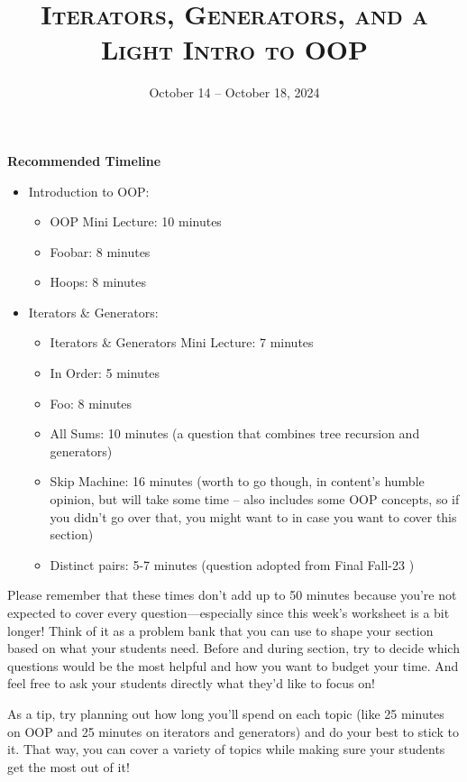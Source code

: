 \documentclass{exam}
\title{\textsc{Iterators, Generators, and a Light Intro to OOP}}
\date{October 14 -- October 18, 2024}
\begin{document}
\maketitle
\begin{guide}
    \textbf{Recommended Timeline}
    \begin{itemize}
        \item Introduction to OOP:
        \begin{itemize}
            \item OOP Mini Lecture: 10 minutes
            \item Foobar: 8 minutes
            \item Hoops: 8 minutes
        \end{itemize}
        \item Iterators \& Generators:
        \begin{itemize}
            \item Iterators \& Generators Mini Lecture: 7 minutes
            \item In Order: 5 minutes
            \item Foo: 8 minutes
            \item All Sums: 10 minutes (a question that combines tree recursion and generators)
            \item Skip Machine: 16 minutes (worth to go though, in content's humble opinion, but will take some time -- also includes some OOP concepts, so if you didn't go over that, you might want to in case you want to cover this section)
           \item Distinct pairs: 5-7 minutes (question adopted from Final Fall-23 )
        \end{itemize}
    \end{itemize}

Please remember that these times don’t add up to 50 minutes because you’re not expected to cover every question—especially since this week’s worksheet is a bit longer! Think of it as a problem bank that you can use to shape your section based on what your students need. Before and during section, try to decide which questions would be the most helpful and how you want to budget your time. And feel free to ask your students directly what they’d like to focus on!

As a tip, try planning out how long you’ll spend on each topic (like 25 minutes on OOP and 25 minutes on iterators and generators) and do your best to stick to it. That way, you can cover a variety of topics while making sure your students get the most out of it!
\end{guide}
\end{document}

